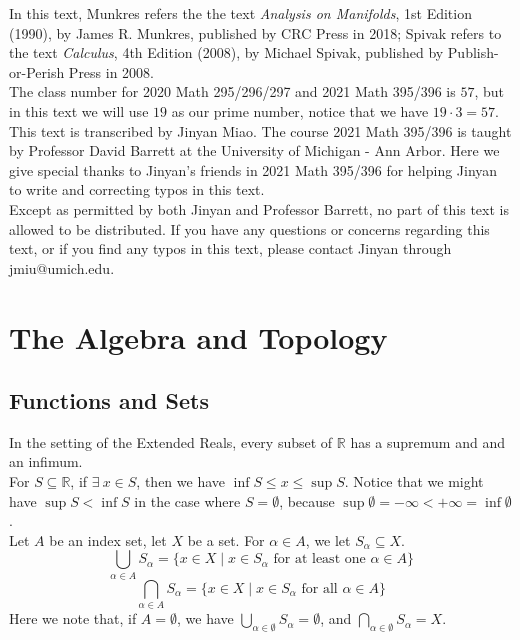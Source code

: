 \documentclass[11pt,oneside]{book}
\theoremstyle{break}
\theoremstyle{break}
\newcommand{\R}{\mathbb{R}}
\begin{document}
In this text, Munkres refers the the text \textit{Analysis on Manifolds}, 1st Edition (1990), by James R. Munkres, published by CRC Press in 2018; Spivak refers to the text \textit{Calculus}, 4th Edition (2008), by Michael Spivak, published by Publish-or-Perish Press in 2008.\\

The class number for 2020 Math 295/296/297 and 2021 Math 395/396 is $57$, but in this text we will use $19$ as our prime number, notice that we have $19\cdot 3 = 57$.\\

This text is transcribed by Jinyan Miao. The course 2021 Math 395/396 is taught by Professor David Barrett at the University of Michigan - Ann Arbor. Here we give special thanks to Jinyan's friends in 2021 Math 395/396 for helping Jinyan to write and correcting typos in this text.\\ 

Except as permitted by both Jinyan and Professor Barrett, no part of this text is allowed to be distributed. If you have any questions or concerns regarding this text, or if you find any typos in this text, please contact Jinyan through jmiu@umich.edu. 


\newpage
\chapter{The Algebra and Topology}

\section[Functions and Sets]{\color{red} Functions and Sets \color{black}}
In the setting of the Extended Reals, every subset of $\R$ has a supremum and and an infimum.\\ For $S\subseteq \R$, if $\exists\ x \in S$, then we have $\inf S\leq x\leq \sup S$. Notice that we might have $\sup S < \inf S$ in the case where $S = \emptyset$, because $\sup \emptyset = -\infty < +\infty = \inf \emptyset$.\\

Let $A$ be an index set, let $X$ be a set. For $\alpha \in A$, we let $S_\alpha \subseteq X$. $$\bigcup_{\alpha \in A} S_\alpha = \{ x \in X\mid x \in S_\alpha \text{ for at least one } \alpha \in A\}$$
$$\bigcap_{\alpha \in A} S_\alpha = \{x\in X \mid x \in S_\alpha \text{ for all } \alpha \in A\}$$
Here we note that, if $A =\emptyset$, we have $\bigcup_{\alpha \in \emptyset}S_\alpha = \emptyset$, and $\bigcap_{\alpha \in \emptyset}S_\alpha = X$.\\
\end{document}
